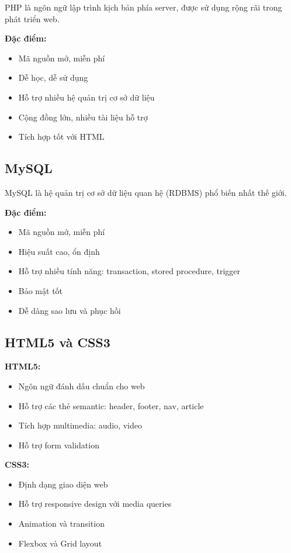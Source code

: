 \documentclass[13pt,a4paper]{extreport}
\begin{document}
PHP là ngôn ngữ lập trình kịch bản phía server, được sử dụng rộng rãi trong phát triển web.

\textbf{Đặc điểm:}
\begin{itemize}
    \item Mã nguồn mở, miễn phí
    \item Dễ học, dễ sử dụng
    \item Hỗ trợ nhiều hệ quản trị cơ sở dữ liệu
    \item Cộng đồng lớn, nhiều tài liệu hỗ trợ
    \item Tích hợp tốt với HTML
\end{itemize}

\subsection{MySQL}

MySQL là hệ quản trị cơ sở dữ liệu quan hệ (RDBMS) phổ biến nhất thế giới.

\textbf{Đặc điểm:}
\begin{itemize}
    \item Mã nguồn mở, miễn phí
    \item Hiệu suất cao, ổn định
    \item Hỗ trợ nhiều tính năng: transaction, stored procedure, trigger
    \item Bảo mật tốt
    \item Dễ dàng sao lưu và phục hồi
\end{itemize}

\subsection{HTML5 và CSS3}

\textbf{HTML5:}
\begin{itemize}
    \item Ngôn ngữ đánh dấu chuẩn cho web
    \item Hỗ trợ các thẻ semantic: header, footer, nav, article
    \item Tích hợp multimedia: audio, video
    \item Hỗ trợ form validation
\end{itemize}

\textbf{CSS3:}
\begin{itemize}
    \item Định dạng giao diện web
    \item Hỗ trợ responsive design với media queries
    \item Animation và transition
    \item Flexbox và Grid layout
\end{itemize}
\end{document}
